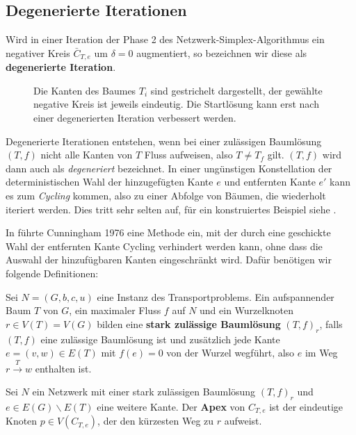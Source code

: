 \subsection{Degenerierte Iterationen}\label{ch:deg}

\begin{defn}Wird in einer Iteration der Phase 2 des Netzwerk-Simplex-Algorithmus ein negativer Kreis $\bar{C}_{T,e}$ um $\delta=0$ augmentiert, so bezeichnen wir diese als \textbf{degenerierte Iteration}.
\end{defn}

\begin{figure}[!ht]\centering
	
	\caption{Die Kanten des Baumes $T_i$ sind gestrichelt dargestellt, der gewählte negative Kreis ist jeweils eindeutig. Die Startlösung kann erst nach einer degenerierten Iteration verbessert werden.}
	\label{fig:deg}
\end{figure}

Degenerierte Iterationen entstehen, wenn bei einer zulässigen Baumlösung $(T,f)$ nicht alle Kanten von $T$ Fluss aufweisen, also $T\neq T_f$ gilt. $(T,f)$ wird dann auch als \emph{degeneriert} bezeichnet. In einer ungünstigen Konstellation der deterministischen Wahl der hinzugefügten Kante $e$ und entfernten Kante $e'$ kann es zum \emph{Cycling} kommen, also zu einer Abfolge von Bäumen, die wiederholt iteriert werden. Dies tritt sehr selten auf, für ein konstruiertes Beispiel siehe \cite[S. 303]{NSAbook}.

In \cite{cycling} führte Cunningham 1976 eine Methode ein, mit der durch eine geschickte Wahl der entfernten Kante Cycling verhindert werden kann, ohne dass die Auswahl der hinzufügbaren Kanten eingeschränkt wird. Dafür benötigen wir folgende Definitionen:

\begin{defn}Sei $N=(G,b,c,u)$ eine Instanz des Transportproblems. Ein aufspannender Baum $T$ von $G$, ein maximaler Fluss $f$ auf $N$ und ein Wurzelknoten $r\in V(T)=V(G)$ bilden eine \textbf{stark zulässige Baumlösung} $(T,f)_r$, falls $(T,f)$ eine zulässige Baumlösung ist und zusätzlich jede Kante $e=(v,w)\in E(T)$ mit $f(e)=0$ von der Wurzel wegführt, also $e$ im Weg $r\xrightarrow{T}w$ enthalten ist.\end{defn}

\begin{defn}Sei $N$ ein Netzwerk mit einer stark zulässigen Baumlösung $(T,f)_r$ und $e\in E(G)\backslash E(T)$ eine weitere Kante. Der \textbf{Apex} von $C_{T,e}$ ist der eindeutige Knoten $p\in V(C_{T,e})$, der den kürzesten Weg zu $r$ aufweist.\end{defn}

